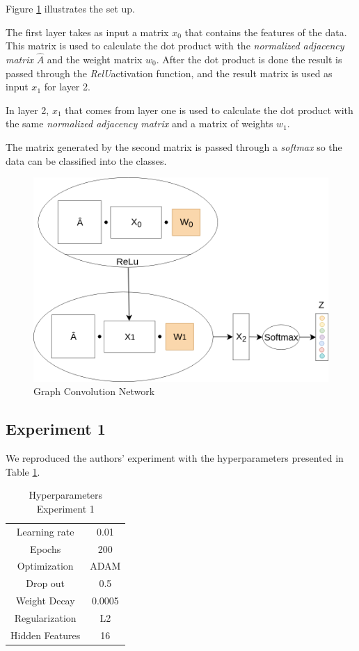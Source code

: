 Figure \ref{fig:model} illustrates the set up.

The first layer takes as input a matrix $x_{0}$ that contains the features of the data. This matrix is used to calculate the dot product with the \textit{normalized adjacency matrix} $\hat{A}$ and the weight matrix $w_{0}$. After the dot product is done the result is passed through the \textit{RelU}activation function, and the result matrix is used as input $x_{1}$ for layer 2.

In layer 2, $x_{1}$ that comes from layer one is used to calculate the dot product with the same \textit{normalized adjacency matrix} and a matrix of weights $w_{1}$.

The matrix generated by the second matrix is passed through a \textit{softmax} so the data can be classified into the classes.

\begin{figure}[h!]
  \centering
  \includegraphics[width=0.8\linewidth]{media/model_right.png}
  \caption{Graph Convolution Network}
  \label{fig:model}
\end{figure}

\subsection{Experiment 1}

We reproduced the authors' experiment with the hyperparameters presented in Table \ref{tab:hyperparameters1}.

\begin {table}[ht]
  \begin{center}
    \begin{tabular}{|c|c|}
    \hline
    Learning rate     & 0.01 \\ 
    Epochs            & 200  \\ 
    Optimization      & ADAM \\
    Drop out          & 0.5   \\
    Weight Decay      & 0.0005 \\
    Regularization    & L2    \\
    Hidden Features   & 16    \\
    \hline
    \end{tabular}
  \end{center}
\caption {Hyperparameters Experiment 1} \label{tab:hyperparameters1} 
\end{table}

